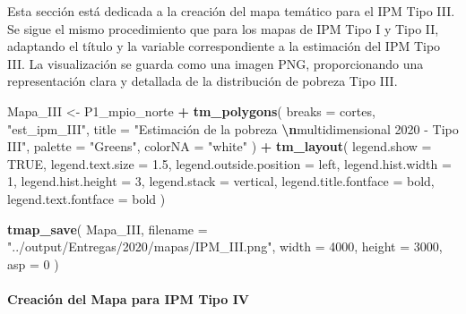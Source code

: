 \documentclass[
  12pt,
]{book}
\newenvironment{Shaded}{\begin{snugshade}}{\end{snugshade}}
\newcommand{\AttributeTok}[1]{\textcolor[rgb]{0.13,0.29,0.53}{#1}}
\newcommand{\ConstantTok}[1]{\textcolor[rgb]{0.56,0.35,0.01}{#1}}
\newcommand{\DecValTok}[1]{\textcolor[rgb]{0.00,0.00,0.81}{#1}}
\newcommand{\FloatTok}[1]{\textcolor[rgb]{0.00,0.00,0.81}{#1}}
\newcommand{\FunctionTok}[1]{\textcolor[rgb]{0.13,0.29,0.53}{\textbf{#1}}}
\newcommand{\NormalTok}[1]{#1}
\newcommand{\OtherTok}[1]{\textcolor[rgb]{0.56,0.35,0.01}{#1}}
\newcommand{\SpecialCharTok}[1]{\textcolor[rgb]{0.81,0.36,0.00}{\textbf{#1}}}
\newcommand{\StringTok}[1]{\textcolor[rgb]{0.31,0.60,0.02}{#1}}
\begin{document}
Esta sección está dedicada a la creación del mapa temático para el IPM Tipo III. Se sigue el mismo procedimiento que para los mapas de IPM Tipo I y Tipo II, adaptando el título y la variable correspondiente a la estimación del IPM Tipo III. La visualización se guarda como una imagen PNG, proporcionando una representación clara y detallada de la distribución de pobreza Tipo III.

\begin{Shaded}
\begin{Highlighting}[]
\NormalTok{Mapa\_III }\OtherTok{\textless{}{-}}
\NormalTok{  P1\_mpio\_norte }\SpecialCharTok{+} \FunctionTok{tm\_polygons}\NormalTok{(}
    \AttributeTok{breaks =}\NormalTok{ cortes,}
    \StringTok{"est\_ipm\_III"}\NormalTok{,}
    \AttributeTok{title =} \StringTok{"Estimación de la pobreza }\SpecialCharTok{\textbackslash{}n}\StringTok{multidimensional 2020 {-} Tipo III"}\NormalTok{,}
    \AttributeTok{palette =} \StringTok{"Greens"}\NormalTok{,}
    \AttributeTok{colorNA =} \StringTok{"white"}
\NormalTok{  ) }\SpecialCharTok{+} \FunctionTok{tm\_layout}\NormalTok{(}
    \AttributeTok{legend.show =} \ConstantTok{TRUE}\NormalTok{,}
    \AttributeTok{legend.text.size =} \FloatTok{1.5}\NormalTok{,}
    \AttributeTok{legend.outside.position =} \StringTok{\textquotesingle{}left\textquotesingle{}}\NormalTok{,}
    \AttributeTok{legend.hist.width =} \DecValTok{1}\NormalTok{,}
    \AttributeTok{legend.hist.height =} \DecValTok{3}\NormalTok{,}
    \AttributeTok{legend.stack =} \StringTok{\textquotesingle{}vertical\textquotesingle{}}\NormalTok{,}
    \AttributeTok{legend.title.fontface =} \StringTok{\textquotesingle{}bold\textquotesingle{}}\NormalTok{,}
    \AttributeTok{legend.text.fontface =} \StringTok{\textquotesingle{}bold\textquotesingle{}}
\NormalTok{  )}

\FunctionTok{tmap\_save}\NormalTok{(}
\NormalTok{  Mapa\_III,}
  \AttributeTok{filename =} \StringTok{"../output/Entregas/2020/mapas/IPM\_III.png"}\NormalTok{,}
  \AttributeTok{width =} \DecValTok{4000}\NormalTok{,}
  \AttributeTok{height =} \DecValTok{3000}\NormalTok{,}
  \AttributeTok{asp =} \DecValTok{0}
\NormalTok{)}
\end{Highlighting}
\end{Shaded}

\hypertarget{creaciuxf3n-del-mapa-para-ipm-tipo-iv}{%
\paragraph*{Creación del Mapa para IPM Tipo IV}\label{creaciuxf3n-del-mapa-para-ipm-tipo-iv}}
\end{document}
